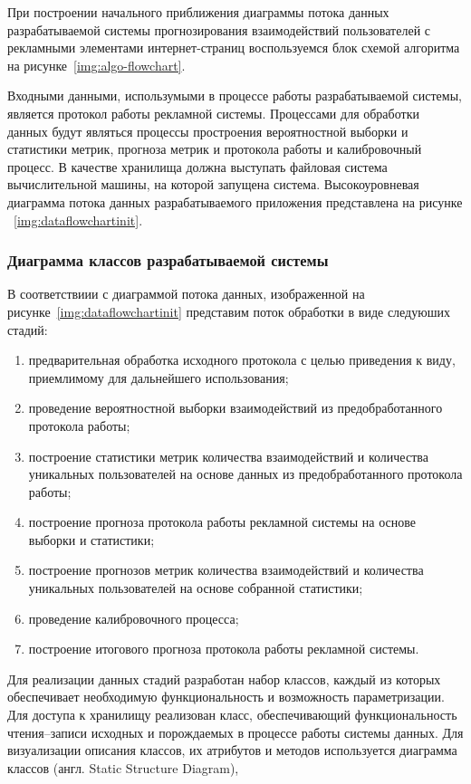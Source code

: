 При построении начального приближения диаграммы потока данных разрабатываемой системы прогнозирования взаимодействий
пользователей с рекламными элементами интернет-страниц воспользуемся блок схемой алгоритма на 
рисунке~\ref{img:algo-flowchart}.

Входными данными, использумыми в процессе работы разрабатываемой системы, является протокол работы рекламной системы.
Процессами для обработки данных будут являться процессы простроения вероятностной выборки и статистики метрик,
прогноза метрик и протокола работы и калибровочный процесс. В качестве хранилища должна выступать файловая система
вычислительной машины, на которой запущена система. Высокоуровневая диаграмма потока данных разрабатываемого приложения
представлена на рисунке ~\ref{img:dataflowchartinit}.


\subsubsection{Диаграмма классов разрабатываемой системы}
В соответствиии с диаграммой потока данных, изображенной на рисунке~\ref{img:dataflowchartinit} представим поток обработки
в виде следуюших стадий:
\begin{enumerate}
    \item предварительная обработка исходного протокола с целью приведения к виду, приемлимому для дальнейшего использования;
    \item проведение вероятностной выборки взаимодействий из предобработанного протокола работы;
    \item построение статистики метрик количества взаимодействий и количества уникальных пользователей на основе данных
    из предобработанного протокола работы;
    \item построение прогноза протокола работы рекламной системы на основе выборки и статистики;
    \item построение прогнозов метрик количества взаимодействий и количества уникальных пользователей на основе собранной
    статистики;
    \item проведение калибровочного процесса;
    \item построение итогового прогноза протокола работы рекламной системы.
\end{enumerate}

Для реализации данных стадий разработан набор классов, каждый из которых обеспечивает необходимую функциональность и
возможность параметризации. Для доступа к хранилищу реализован класс, обеспечивающий функциональность чтения--записи
исходных и порождаемых в процессе работы системы данных. Для визуализации описания классов, их атрибутов и 
методов используется диаграмма классов (англ. Static Structure Diagram),

